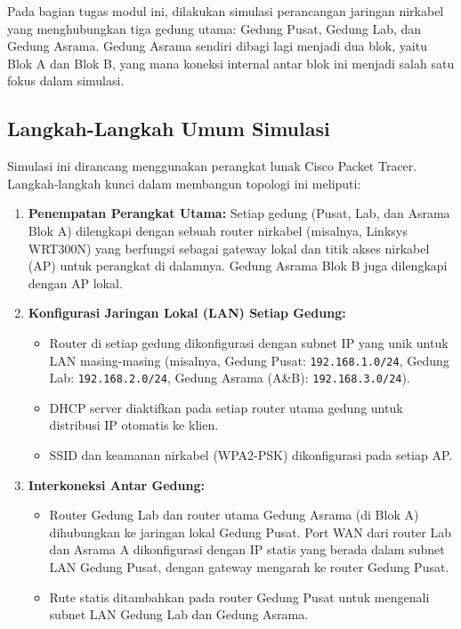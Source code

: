 Pada bagian tugas modul ini, dilakukan simulasi perancangan jaringan nirkabel yang menghubungkan tiga gedung utama: Gedung Pusat, Gedung Lab, dan Gedung Asrama. Gedung Asrama sendiri dibagi lagi menjadi dua blok, yaitu Blok A dan Blok B, yang mana koneksi internal antar blok ini menjadi salah
satu fokus dalam simulasi.

\subsection{Langkah-Langkah Umum Simulasi}
Simulasi ini dirancang menggunakan perangkat lunak Cisco Packet Tracer. Langkah-langkah kunci dalam membangun topologi ini meliputi:
\begin{enumerate}
    \item \textbf{Penempatan Perangkat Utama:} Setiap gedung (Pusat, Lab, dan Asrama Blok A) dilengkapi dengan sebuah router nirkabel (misalnya, Linksys WRT300N) yang berfungsi sebagai gateway lokal dan titik akses nirkabel (AP) untuk perangkat di dalamnya. Gedung Asrama Blok B juga dilengkapi dengan AP lokal.
    \item \textbf{Konfigurasi Jaringan Lokal (LAN) Setiap Gedung:}
        \begin{itemize}
            \item Router di setiap gedung dikonfigurasi dengan subnet IP yang unik untuk LAN masing-masing (misalnya, Gedung Pusat: \texttt{192.168.1.0/24}, Gedung Lab: \texttt{192.168.2.0/24}, Gedung Asrama (A\&B): \texttt{192.168.3.0/24}).
            \item DHCP server diaktifkan pada setiap router utama gedung untuk distribusi IP otomatis ke klien.
            \item SSID dan keamanan nirkabel (WPA2-PSK) dikonfigurasi pada setiap AP.
        \end{itemize}
    \item \textbf{Interkoneksi Antar Gedung:}
        \begin{itemize}
            \item Router Gedung Lab dan router utama Gedung Asrama (di Blok A) dihubungkan ke jaringan lokal Gedung Pusat. Port WAN dari router Lab dan Asrama A dikonfigurasi dengan IP statis yang berada dalam subnet LAN Gedung Pusat, dengan gateway mengarah ke router Gedung Pusat.
            \item Rute statis ditambahkan pada router Gedung Pusat untuk mengenali subnet LAN Gedung Lab dan Gedung Asrama.
        \end{itemize}

\end{enumerate}
